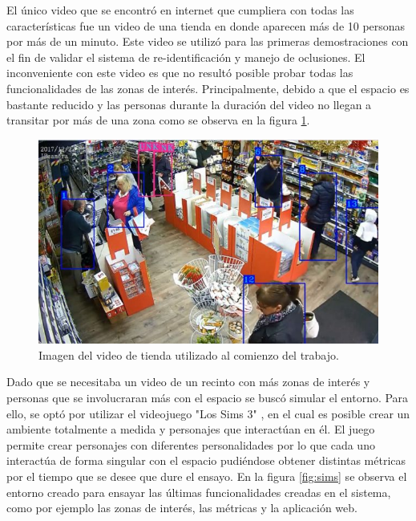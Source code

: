 El único video que se encontró en internet que cumpliera con todas las características fue un video de una tienda \citep{TIENDA_ORIGINAL} en donde aparecen más de 10 personas por más de un minuto. Este video se utilizó para las primeras demostraciones \citep{DEMO:1} con el fin de validar el sistema de re-identificación y manejo de oclusiones. El inconveniente con este video es que no resultó posible probar todas las funcionalidades de las zonas de interés. Principalmente, debido a que el espacio es bastante reducido y las personas durante la duración del video no llegan a transitar por más de una zona como se observa en la figura \ref{fig:tienda}.

\begin{figure}[ht]
	\centering
	\includegraphics[scale=.70]{./Figures/tienda.jpg}
	\caption{Imagen del video de tienda utilizado al comienzo del trabajo.}
	\label{fig:tienda}
\end{figure}

\newpage

Dado que se necesitaba un video de un recinto con más zonas de interés y personas que se involucraran más con el espacio se buscó simular el entorno. Para ello, se optó por utilizar el videojuego "Los Sims 3" \citep{SIMS3}, en el cual es posible crear un ambiente totalmente a medida y personajes que interactúan en él. El juego permite crear personajes con diferentes personalidades por lo que cada uno interactúa de forma singular con el espacio pudiéndose obtener distintas métricas por el tiempo que se desee que dure el ensayo. En la figura \ref{fig:sims} se observa el entorno creado para ensayar las últimas funcionalidades creadas en el sistema, como por ejemplo las zonas de interés, las métricas y la aplicación web.

